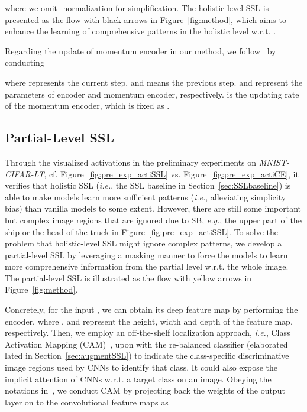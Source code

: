 \documentclass[10pt,journal,compsoc]{IEEEtran}
\newcommand{\eg}{\emph{e.g.}}
\newcommand{\ie}{\emph{i.e.}}
\begin{document}
where we omit -normalization for simplification. The holistic-level SSL is presented as the flow with black arrows in Figure~\ref{fig:method}, which aims to enhance the learning of comprehensive patterns in the holistic level w.r.t. .

Regarding the update of momentum encoder in our method, we follow~\cite{He_2020_CVPR} by conducting

where  represents the current step, and  means the previous step.  and  represent the parameters of encoder and momentum encoder, respectively.  is the updating rate of the momentum encoder, which is fixed as .

\subsection{Partial-Level SSL}

Through the visualized activations in the preliminary experiments on \emph{MNIST-CIFAR-LT}, cf. Figure~\ref{fig:pre_exp_actiSSL} vs. Figure~\ref{fig:pre_exp_actiCE}, it verifies that holistic SSL (\ie, the SSL baseline in Section~\ref{sec:SSLbaseline}) is able to make models learn more sufficient patterns (\ie, alleviating simplicity bias) than vanilla models to some extent. However, there are still some important but complex image regions that are ignored due to SB, \eg, the upper part of the ship or the head of the truck in Figure~\ref{fig:pre_exp_actiSSL}. To solve the problem that holistic-level SSL might ignore complex patterns, we develop a partial-level SSL by leveraging a masking manner to force the models to learn more comprehensive information from the partial level w.r.t. the whole image. The partial-level SSL is illustrated as the flow with yellow arrows in Figure~\ref{fig:method}.

Concretely, for the input , we can obtain its deep feature map  by performing the encoder, where ,  and  represent the height, width and depth of the feature map, respectively. Then, we employ an off-the-shelf localization approach, \ie, Class Activation Mapping (CAM)~\cite{CAM}, upon  with the re-balanced classifier  (elaborated lated in Section~\ref{sec:augmentSSL}) to indicate the class-specific discriminative image regions used by CNNs to identify that class. It could also expose the implicit attention of CNNs w.r.t. a target class on an image. Obeying the notations in~\cite{CAM}, we conduct CAM by projecting back the weights of the output layer on to the convolutional feature maps as
\end{document}
